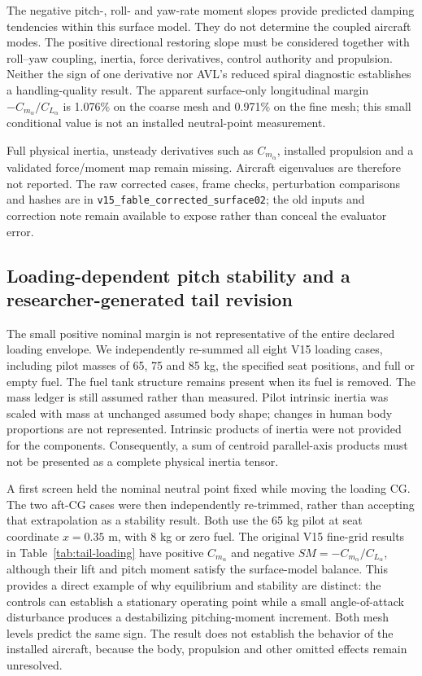 \documentclass[10pt,letterpaper]{article}
\begin{document}
The negative pitch-, roll- and yaw-rate moment slopes provide predicted
damping tendencies within this surface model. They do not determine the
coupled aircraft modes. The positive directional restoring slope must be
considered together with roll--yaw coupling, inertia, force derivatives,
control authority and propulsion. Neither the sign of one derivative nor
AVL's reduced spiral diagnostic establishes a handling-quality result.
The apparent surface-only longitudinal margin $-C_{m_\alpha}/C_{L_\alpha}$ is 1.076\% on the coarse mesh and 0.971\% on the fine mesh; this small conditional value is not an installed neutral-point measurement.

Full physical inertia, unsteady derivatives such as
$C_{m_{\dot\alpha}}$, installed propulsion and a validated force/moment map
remain missing. Aircraft eigenvalues are therefore not reported. The raw
corrected cases, frame checks, perturbation comparisons and hashes are in
\texttt{v15\_fable\_corrected\_surface02}; the old inputs and correction note
remain available to expose rather than conceal the evaluator error.


\subsection{Loading-dependent pitch stability and a researcher-generated tail revision}
\label{sec:tail-loading-revision}

The small positive nominal margin is not representative of the entire declared
loading envelope. We independently re-summed all eight V15 loading cases,
including pilot masses of 65, 75 and 85 kg, the specified seat positions, and
full or empty fuel. The fuel tank structure remains present when its fuel is
removed. The mass ledger is still assumed rather than measured. Pilot intrinsic
inertia was scaled with mass at unchanged assumed body shape; changes in human
body proportions are not represented. Intrinsic products of inertia were not
provided for the components. Consequently, a sum of centroid parallel-axis
products must not be presented as a complete physical inertia tensor.

A first screen held the nominal neutral point fixed while moving the loading
CG. The two aft-CG cases were then independently re-trimmed, rather than accepting
that extrapolation as a stability result. Both use the 65 kg pilot at seat
coordinate $x=0.35$ m, with 8 kg or zero fuel. The original V15 fine-grid results
in Table~\ref{tab:tail-loading} have positive $C_{m_\alpha}$ and negative
$SM=-C_{m_\alpha}/C_{L_\alpha}$, although their lift and pitch moment satisfy
the surface-model balance. This provides a direct example of why equilibrium
and stability are distinct: the controls can establish a stationary operating
point while a small angle-of-attack disturbance produces a destabilizing
pitching-moment increment. Both mesh levels predict the same sign. The result
does not establish the behavior of the installed aircraft, because the body,
propulsion and other omitted effects remain unresolved.
\end{document}

